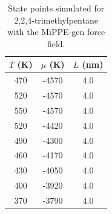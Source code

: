 \documentclass[journal=jctc,manuscript=article]{achemso}
\begin{document}
\begin{table}[htb!]
	\caption{State points simulated for 2,2,4-trimethylpentane with the MiPPE-gen force field.}
	\begin{center}
		\begin{tabular}{|c|c|c|}
			\hline
			$T$ (K) & $\mu$ (K) & $L$ (nm) \\ \hline
			470	&	-4570	&	4.0	\\
			520	&	-4570	&	4.0	\\
			550	&	-4570	&	4.0	\\
			520	&	-4420	&	4.0	\\
			490	&	-4300	&	4.0	\\
			460	&	-4170	&	4.0	\\
			430	&	-4050	&	4.0	\\
			400	&	-3920	&	4.0	\\
			370	&	-3790	&	4.0	\\
			\hline
		\end{tabular}
	\end{center}
\end{table}
\end{document}
